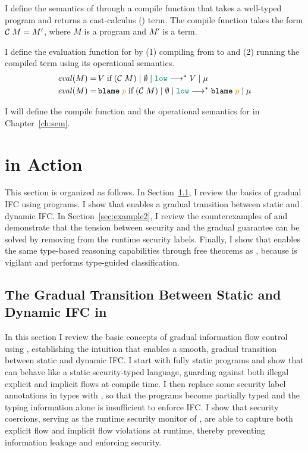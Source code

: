 
I define the semantics of \Surface through a compile function that takes a
well-typed \Surface program and returns a cast-calculus (\CC) term. The compile
function takes the form $\mathcal{C}\;{M} = M'$, where $M$ is a \Surface program and
$M'$ is a \CC term.

I define the evaluation function for \Surface by (1) compiling from \Surface to
\CC and (2) running the compiled \CC term using its operational semantics.
\begin{align*}
  \mathit{eval}(M) =&\,V\;\text{if}\;\reducemult{(\compile{M})}{\emptyset}{\low}{V}{\mu} \\
  \mathit{eval}(M) =&\,\blame{\bl{p}}\;\text{if}\;\reducemult{(\compile{M})}{\emptyset}{\low}{\blame{\bl{p}}}{\mu}
\end{align*}

I will define the compile function and the operational semantics for \CC in
Chapter~\ref{ch:sem}.

\section{\Surface in Action}
\label{sec:examples}

This section is organized as follows. In Section~\ref{sec:example1}, I review
the basics of gradual IFC using \Surface programs. I show that \Surface enables
a gradual transition between static and dynamic IFC. In
Section~\ref{sec:example2}, I review the counterexamples of
\textcite{Toro:2018aa} and demonstrate that the tension between security and the
gradual guarantee can be solved by removing \unk from the runtime security
labels. Finally, I show that \Surface enables the same type-based reasoning
capabilities through free theorems as \GSLRef, because \Surface is vigilant and
performs type-guided classification.

\subsection{The Gradual Transition Between Static and Dynamic IFC in \Surface}
\label{sec:example1}

In this section I review the basic concepts of gradual information flow control
using \Surface, establishing the intuition that \Surface enables a smooth,
gradual transition between static and dynamic IFC. I start with fully static
\Surface programs and show that \Surface can behave like a static security-typed
language, guarding against both illegal explicit and implicit flows at compile
time. I then replace some security label annotations in types with \unk, so that
the programs become partially typed and the typing information alone is
insufficient to enforce IFC. I show that security coercions, serving as the
runtime security monitor of \Surface, are able to capture both explicit flow and
implicit flow violations at runtime, thereby preventing information leakage and
enforcing security.

